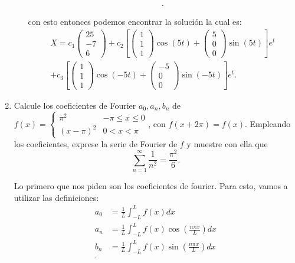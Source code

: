 \documentclass[12pt]{exam}
\begin{document}
\begin{enumerate}
\begin{enumerate}
\begin{align*}
    .\end{align*}

    con esto entonces podemos encontrar la solución la cual es:
    \begin{align*}
        X = c_1 \begin{pmatrix} 25 \\ -7 \\6 \end{pmatrix} + c_2 \left[ \begin{pmatrix} 1\\1\\1 \end{pmatrix} \cos\left( 5t \right) + \begin{pmatrix} 5\\0\\0 \end{pmatrix} \sin\left( 5t \right)  \right] e^{t} \\
        +c_3 \left[ \begin{pmatrix} 1\\1\\1 \end{pmatrix} \cos\left( -5t \right) + \begin{pmatrix} -5\\0\\0 \end{pmatrix} \sin\left( -5t \right)  \right] e^{t}
    .\end{align*}
    \end{enumerate}

  \item Calcule los coeficientes de Fourier $a_0,a_n,b_n$ de $f\left( x \right) = \left\{  
      \begin{array}{lcc}
	\pi^2 & -\pi\le x\le 0\\
	\left( x-\pi \right)^2 & 0 < x <\pi
      \end{array}
    \right. $, con $f\left( x + 2\pi \right) = f\left( x \right) $. Empleando los coeficientes, exprese la serie de Fourier de $f$ y muestre con ella que  \[
      \sum_{n=1}^{\infty} \frac{1}{n^2}=\frac{\pi^2}{6}
    .\] 

    Lo primero que nos piden son los coeficientes de fourier. Para esto, vamos a utilizar las definiciones:
    \begin{align*}
      a_0 &= \frac{1}{L}\int_{-L}^{L}f\left( x \right) dx \\
      a_n &= \frac{1}{L}\int_{-L}^{L}f\left( x \right) \cos\left( \frac{n\pi x}{L} \right) dx \\
      b_n &= \frac{1}{L}\int_{-L}^{L}f\left( x \right) \sin\left( \frac{n\pi x}{L} \right) dx \\
    .\end{align*}


\end{enumerate}
\end{document}
